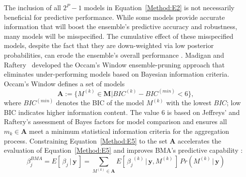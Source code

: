 \documentclass[journal=jpcbfk, manuscript=article]{achemso}
\newcommand{\+}[1]{\ensuremath{\mathbf{#1}}}
\begin{document}
The inclusion of all $2^P-1$ models in Equation~\ref{Method:E2} is not necessarily beneficial for predictive performance.
While some models provide accurate information that will boost the ensemble's predictive accuracy and robustness, many models will be misspecified.
The cumulative effect of these misspecified models, despite the fact that they are down-weighted via low posterior probabilities, can erode the ensemble's overall performance \cite{Qian:2015, Martinez-Munoz:2009, Raftery:1998, Onorante:2014, Madigan:1994, Hoeting:1999, Morales-Casique:2010}.
Madigan and Raftery~\cite{Madigan:1994} developed the Occam's Window ensemble-pruning approach that eliminates under-performing models based on Bayesian information criteria.
Occam's Window defines a set of models
\begin{equation} \label{Method:E5}
	\textbf{A} := \{M^{(k)} \in \textbf{M} | BIC^{(k)} - BIC^{(min)} < 6\},
\end{equation}
where $BIC^{(min)}$ denotes the BIC of the model $M^{(k)}$ with the lowest $BIC$; low BIC indicates higher information content.
The value 6 is based on Jeffreys' \cite{Jefferys:1961} and Raftery's \cite{Raftery:1995} assessment of Bayes factors for model comparison and ensures all $m_k \in \mathbf{A}$ meet a minimum statistical information criteria for the aggregation process.
Constraining Equation~\ref{Method:E5} to the set $\+A$ accelerates the evaluation of Equation~\ref{Method:E5} and improves BMA's predictive capability \cite{Raftery:1998, Madigan:1994}:
\begin{equation} \label{Method:E6}
	\beta^{BMA}_j =  E[\,\beta_j \,|\, \+y\,] = \sum_{M^{(k)}\in \mathbf{A}} E[\,{\beta_j}^{(k)} \,|\, \+y,M^{(k)}\,] \,Pr(M^{(k)} \,|\, \textbf{y})
\end{equation}
\end{document}
